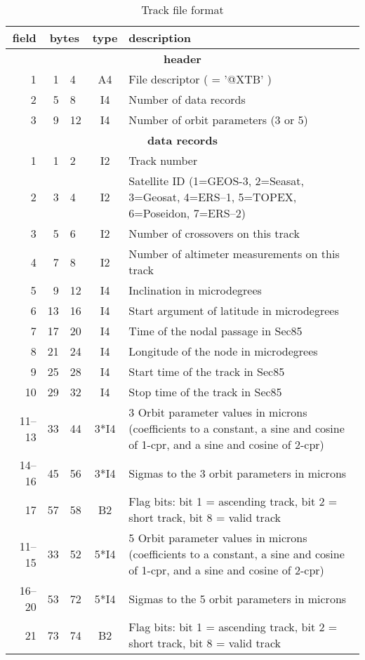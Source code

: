 \begin{table}
\caption{Track file format}
\medskip
\begin{tabular}{|rr@{--}lc|p{}|}
\hline
field&\multicolumn{2}{c}{bytes}&type&description \\
\hline
\multicolumn{5}{c}{\bf header} \\
\hline
 1 & 1 & 4 & A4 & File descriptor ( = '@XTB' ) \\
 2 & 5 & 8 & I4 & Number of data records \\
 3 & 9 &12 & I4 & Number of orbit parameters (3 or 5) \\
\hline
\multicolumn{5}{c}{\bf data records} \\
\hline
 1 & 1 & 2 & I2 & Track number \\
 2 & 3 & 4 & I2 & Satellite ID (1=GEOS-3, 2=Seasat, 3=Geosat, 4=ERS--1,
 5=TOPEX, 6=Poseidon, 7=ERS--2) \\
 3 & 5 & 6 & I2 & Number of crossovers on this track \\
 4 & 7 & 8 & I2 & Number of altimeter measurements on this track \\
 5 & 9 &12 & I4 & Inclination in microdegrees \\
 6 &13 &16 & I4 & Start argument of latitude in microdegrees \\
 7 &17 &20 & I4 & Time of the nodal passage in Sec85 \\
 8 &21 &24 & I4 & Longitude of the node in microdegrees \\
 9 &25 &28 & I4 & Start time of the track in Sec85 \\
10 &29 &32 & I4 & Stop time of the track in Sec85 \\
\hline
11--13&33 & 44 & 3*I4 & 3 Orbit parameter values in microns (coefficients
   to a constant, a sine and cosine of 1-cpr, and a sine and cosine of
   2-cpr) \\
14--16&45 & 56 & 3*I4 & Sigmas to the 3 orbit parameters in microns \\
17 & 57 & 58 & B2 & Flag bits: bit 1 = ascending track, bit 2 = short track,
   bit 8 = valid track \\
\hline
11--15&33 & 52 & 5*I4 & 5 Orbit parameter values in microns (coefficients
   to a constant, a sine and cosine of 1-cpr, and a sine and cosine of
   2-cpr) \\
16--20&53 & 72 & 5*I4 & Sigmas to the 5 orbit parameters in microns \\
21 & 73 & 74 & B2 & Flag bits: bit 1 = ascending track, bit 2 = short track,
   bit 8 = valid track \\
\hline
\end{tabular}
\end{table}

